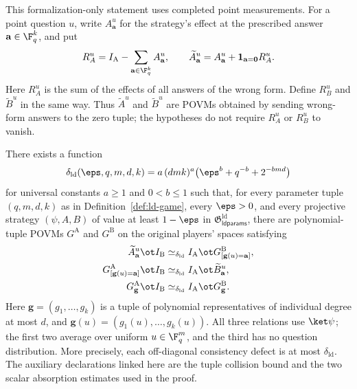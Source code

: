 \begin{theorem}
	\label{lem:ld-soundness-formalized}
	\leanok
	This formalization-only statement uses completed point measurements.
	For a point question $u$, write $A^u_{\mathbf a}$ for the strategy's
	effect at the prescribed answer $\mathbf a\in\F_q^k$, and put
	\[
		R_A^u=I_{\mathrm A}-\sum_{\mathbf a\in\F_q^k}A^u_{\mathbf a},
		\qquad
		\widetilde A^u_{\mathbf a}
		=A^u_{\mathbf a}+\mathbf 1_{\mathbf a=\mathbf 0}R_A^u.
	\]
	Here $R_A^u$ is the sum of the effects of all answers of the wrong
	form. Define $R_B^u$ and $\widetilde B^u$ in the same way. Thus
	$\widetilde A^u$ and $\widetilde B^u$ are POVMs obtained by sending
	wrong-form answers to the zero tuple; the hypotheses do not require
	$R_A^u$ or $R_B^u$ to vanish.

	There exists a function
	\[
		\delta_{\mathrm{ld}}(\eps, q, m, d, k) = a\,(dmk)^a \bigl(\eps^b + q^{-b} + 2^{-bmd}\bigr)
	\]
	for universal constants $a\ge1$ and $0<b\le1$ such that, for every
	parameter tuple $(q,m,d,k)$ as in Definition~\ref{def:ld-game}, every
	$\eps>0$, and every projective strategy $(\psi,A,B)$ of value at least
	$1-\eps$ in $\mathfrak{G}^{\mathrm{ld}}_{\mathsf{ldparams}}$, there are
	polynomial-tuple POVMs $G^{\mathrm A}$ and $G^{\mathrm B}$ on the original
	players' spaces satisfying
	\begin{align*}
		\widetilde A^u_{\mathbf a}\ot I_{\mathrm B}
		&\simeq_{\delta_{\mathrm{ld}}}
		I_{\mathrm A}\ot G^{\mathrm B}_{[\mathbf g(u)=\mathbf a]},\\
		G^{\mathrm A}_{[\mathbf g(u)=\mathbf a]}\ot I_{\mathrm B}
		&\simeq_{\delta_{\mathrm{ld}}}
		I_{\mathrm A}\ot\widetilde B^u_{\mathbf a},\\
		G^{\mathrm A}_{\mathbf g}\ot I_{\mathrm B}
		&\simeq_{\delta_{\mathrm{ld}}}
		I_{\mathrm A}\ot G^{\mathrm B}_{\mathbf g}.
	\end{align*}
	Here $\mathbf g=(g_1,\ldots,g_k)$ is a tuple of polynomial
	representatives of individual degree at most $d$, and
	$\mathbf g(u)=(g_1(u),\ldots,g_k(u))$. All three relations use
	$\ket\psi$; the first two average over uniform $u\in\F_q^m$, and the
	third has no question distribution. More precisely, each off-diagonal
	consistency defect is at most $\delta_{\mathrm{ld}}$.
	The auxiliary declarations linked here are the tuple collision bound
	and the two scalar absorption estimates used in the proof.
\end{theorem}
